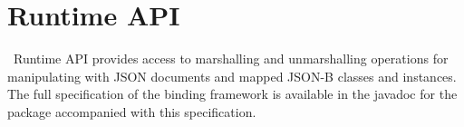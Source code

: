 \chapter{Runtime API}
\label{runtime}

\jsonb\ Runtime API provides access to marshalling and unmarshalling operations for manipulating with JSON documents and mapped JSON-B classes and instances. The full specification of the binding framework is available in the javadoc for the  package accompanied with this specification.

